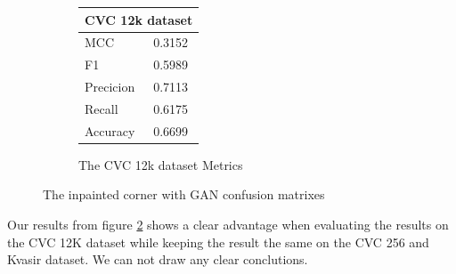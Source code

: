 \begin{figure}[h]
\begin{subfigure}[b]{0.25\textwidth}
        \begin{tabular}{ll}
        \toprule
        \multicolumn{2}{c}{CVC 12k dataset}        \\
        \midrule
        MCC 		& 0.3152 \\
        F1  		& 0.5989 \\
        Precicion  	& 0.7113 \\
        Recall     	& 0.6175 \\
        Accuracy	& 0.6699 \\
        \bottomrule
        \end{tabular}
\caption{The CVC 12k dataset Metrics}
\label{tab:cvc12k_metrics_IRV2_GAN_CORNER}
\end{subfigure}
\caption{The inpainted corner with GAN confusion matrixes}
\label{fig:results_IRV2_GAN_CORNER}
\end{figure}
\FloatBarrier

Our results from figure \ref{fig:results_IRV2_GAN_CORNER} shows a clear advantage when evaluating the results on the CVC 12K dataset while keeping the result the same on the CVC 256 and Kvasir dataset. 
We can not draw any clear conclutions.



